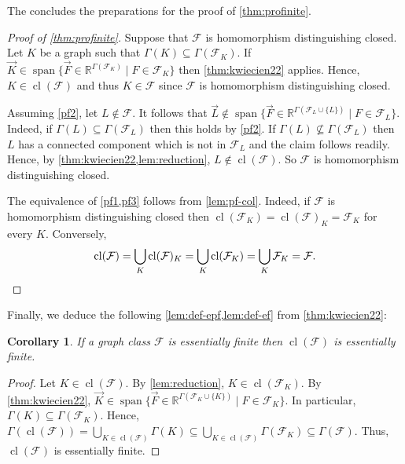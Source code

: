 \documentclass[3p,final]{elsarticle}
\DeclareMathOperator{\spn}{span}
\DeclareMathOperator{\cl}{cl}
\newtheorem{corollary}[theorem]{Corollary}
\begin{document}
	The concludes the preparations for the proof of \cref{thm:profinite}.
	
	\begin{proof}[Proof of \cref{thm:profinite}]
		Suppose that $\mathcal{F}$ is homomorphism distinguishing closed.
		Let $K$ be a graph such that $\Gamma(K) \subseteq \Gamma(\mathcal{F}_K)$.
		If $\vec{K} \in \spn \{\vec{F} \in \mathbb{R}^{\Gamma(\mathcal{F}_{K})} \mid F \in \mathcal{F}_{K}\}$
		then \cref{thm:kwiecien22} applies. Hence, $K \in \cl(\mathcal{F})$ and thus $K \in \mathcal{F}$ since $\mathcal{F}$ is homomorphism distinguishing closed.
		
		Assuming \cref{pf2}, let $L \not\in \mathcal{F}$.
		It follows that $\vec{L} \not\in \spn\{\vec{F} \in \mathbb{R}^{\Gamma(\mathcal{F}_L \cup \{L\}) } \mid F \in \mathcal{F}_L\}$.
		Indeed, if $\Gamma(L) \subseteq \Gamma(\mathcal{F}_L)$ then this holds by \cref{pf2}. If $\Gamma(L) \not\subseteq \Gamma(\mathcal{F}_L)$ then $L$ has a connected component which is not in $\mathcal{F}_L$ and the claim follows readily.
		Hence, by \cref{thm:kwiecien22,lem:reduction}, $L \not\in \cl(\mathcal{F})$. So $\mathcal{F}$ is homomorphism distinguishing closed.
		
		The equivalence of \cref{pf1,pf3} follows from \cref{lem:pf-col}. Indeed, if $\mathcal{F}$ is homomorphism distinguishing closed then
		$\cl(\mathcal{F}_K) = \cl(\mathcal{F})_K = \mathcal{F}_K$ for every $K$.
		Conversely,
		\[
		\cl(\mathcal{F}) = \bigcup_{K} \cl(\mathcal{F})_K = \bigcup_{K} \cl(\mathcal{F}_K) = \bigcup_K \mathcal{F}_K = \mathcal{F}. \qedhere
		\]
	\end{proof}
	
	Finally, we deduce the following \cref{lem:def-epf,lem:def-ef} from \cref{thm:kwiecien22}:
	
	
	\begin{corollary} \label{lem:def-ef}
		If a graph class $\mathcal{F}$ is essentially finite then $\cl(\mathcal{F})$ is essentially finite.
	\end{corollary}
	\begin{proof}
				Let $K \in \cl(\mathcal{F})$. By \cref{lem:reduction}, $K \in \cl(\mathcal{F}_K)$. 
		By \cref{thm:kwiecien22}, $\vec{K} \in \spn \{\vec{F} \in \mathbb{R}^{\Gamma(\mathcal{F}_K \cup \{K\})} \mid F \in \mathcal{F}_K\}$. In particular, $\Gamma(K) \subseteq \Gamma(\mathcal{F}_K)$. Hence, $\Gamma(\cl(\mathcal{F})) = \bigcup_{K \in \cl(\mathcal{F})} \Gamma(K) \subseteq \bigcup_{K \in \cl(\mathcal{F})} \Gamma(\mathcal{F}_K) \subseteq \Gamma(\mathcal{F})$. Thus, $\cl(\mathcal{F})$ is essentially finite.
	\end{proof}
\end{document}
